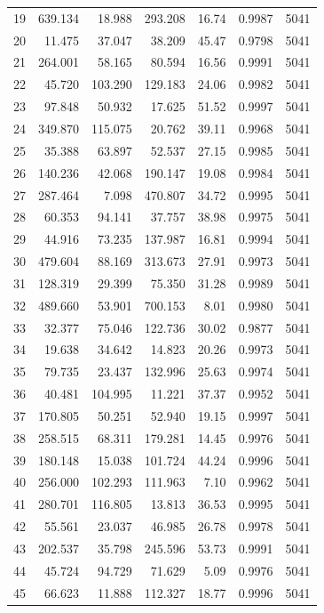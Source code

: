 \begin{longtable}{rrrrrrr}
19 & 639.134 & 18.988 & 293.208 & 16.74 & 0.9987 & 5041 \\
20 & 11.475 & 37.047 & 38.209 & 45.47 & 0.9798 & 5041 \\
21 & 264.001 & 58.165 & 80.594 & 16.56 & 0.9991 & 5041 \\
22 & 45.720 & 103.290 & 129.183 & 24.06 & 0.9982 & 5041 \\
23 & 97.848 & 50.932 & 17.625 & 51.52 & 0.9997 & 5041 \\
24 & 349.870 & 115.075 & 20.762 & 39.11 & 0.9968 & 5041 \\
25 & 35.388 & 63.897 & 52.537 & 27.15 & 0.9985 & 5041 \\
26 & 140.236 & 42.068 & 190.147 & 19.08 & 0.9984 & 5041 \\
27 & 287.464 & 7.098 & 470.807 & 34.72 & 0.9995 & 5041 \\
28 & 60.353 & 94.141 & 37.757 & 38.98 & 0.9975 & 5041 \\
29 & 44.916 & 73.235 & 137.987 & 16.81 & 0.9994 & 5041 \\
30 & 479.604 & 88.169 & 313.673 & 27.91 & 0.9973 & 5041 \\
31 & 128.319 & 29.399 & 75.350 & 31.28 & 0.9989 & 5041 \\
32 & 489.660 & 53.901 & 700.153 & 8.01 & 0.9980 & 5041 \\
33 & 32.377 & 75.046 & 122.736 & 30.02 & 0.9877 & 5041 \\
34 & 19.638 & 34.642 & 14.823 & 20.26 & 0.9973 & 5041 \\
35 & 79.735 & 23.437 & 132.996 & 25.63 & 0.9974 & 5041 \\
36 & 40.481 & 104.995 & 11.221 & 37.37 & 0.9952 & 5041 \\
37 & 170.805 & 50.251 & 52.940 & 19.15 & 0.9997 & 5041 \\
38 & 258.515 & 68.311 & 179.281 & 14.45 & 0.9976 & 5041 \\
39 & 180.148 & 15.038 & 101.724 & 44.24 & 0.9996 & 5041 \\
40 & 256.000 & 102.293 & 111.963 & 7.10 & 0.9962 & 5041 \\
41 & 280.701 & 116.805 & 13.813 & 36.53 & 0.9995 & 5041 \\
42 & 55.561 & 23.037 & 46.985 & 26.78 & 0.9978 & 5041 \\
43 & 202.537 & 35.798 & 245.596 & 53.73 & 0.9991 & 5041 \\
44 & 45.724 & 94.729 & 71.629 & 5.09 & 0.9976 & 5041 \\
45 & 66.623 & 11.888 & 112.327 & 18.77 & 0.9996 & 5041 \\

\end{longtable}
